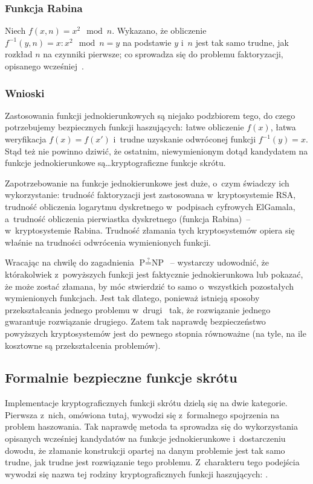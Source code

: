 \subsubsection{Funkcja Rabina}
Niech $f(x,n) = x^2 \mod n$. Wykazano, że obliczenie $f^{-1}(y,n) = x : x^2
\mod n = y$ na podstawie $y$ i~$n$ jest tak samo trudne, jak rozkład $n$ na
czynniki pierwsze; co sprowadza się do problemu faktoryzacji, opisanego
wcześniej~\cite{gregg2003factoring}.



\subsubsection{Wnioski}
Zastosowania funkcji jednokierunkowych są niejako podzbiorem tego, do czego
potrzebujemy bezpiecznych funkcji haszujących: łatwe obliczenie $f(x)$, łatwa
weryfikacja $f(x)=f(x')$ i~trudne uzyskanie odwróconej funkcji $f^{-1}(y)=x$.
Stąd też nie powinno dziwić, że ostatnim, niewymienionym dotąd kandydatem na
funkcje jednokierunkowe są\ldots kryptograficzne funkcje skrótu.

Zapotrzebowanie na funkcje jednokierunkowe jest duże, o~czym świadczy ich
wykorzystanie: trudność faktoryzacji jest zastosowana w~kryptosystemie RSA,
trudność obliczenia logarytmu dyskretnego w~podpisach cyfrowych ElGamala,
a~trudność obliczenia pierwiastka dyskretnego (funkcja Rabina)~--
w~kryptosystemie Rabina. Trudność złamania tych kryptosystemów opiera się
właśnie na trudności odwrócenia wymienionych funkcji.

Wracając na chwilę do zagadnienia $\textrm{P} \stackrel{?}{=} \textrm{NP}$~--
wystarczy udowodnić, że którakolwiek z~powyższych funkcji jest faktycznie
jednokierunkowa lub pokazać, że może zostać złamana, by móc stwierdzić to samo
o~wszystkich pozostałych wymienionych funkcjach. Jest tak dlatego, ponieważ
istnieją sposoby przekształcania jednego problemu
w~drugi~\cite{gregg2003factoring,bach1984discrete} tak, że rozwiązanie jednego
gwarantuje rozwiązanie drugiego. Zatem tak naprawdę bezpieczeństwo powyższych
kryptosystemów jest do pewnego stopnia równoważne (na tyle, na ile kosztowne są
przekształcenia problemów).



\pagebreak
\subsection{Formalnie bezpieczne funkcje skrótu}
Implementacje kryptograficznych funkcji skrótu dzielą się na dwie kategorie.
Pierwsza z~nich, omówiona tutaj, wywodzi się z~formalnego spojrzenia na problem
haszowania. Tak naprawdę metoda ta sprowadza się do wykorzystania opisanych
wcześniej kandydatów na funkcje jednokierunkowe i~dostarczeniu dowodu, że
złamanie konstrukcji opartej na danym problemie jest tak samo trudne, jak
trudne jest rozwiązanie tego problemu. Z~charakteru tego podejścia wywodzi się
nazwa tej rodziny kryptograficznych funkcji haszujących: .

